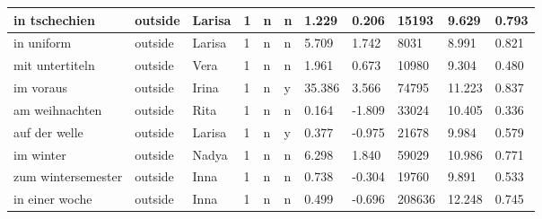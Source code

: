 \begin{longtable}{|p{4cm}|p{1cm}|p{1.2cm}|p{0.5cm}|p{0.5cm}|p{0.5cm}|R{1cm}|R{1cm}|R{1cm}|R{1cm}|R{1cm}|}
in tschechien              & outside           & Larisa        & 1                                   & n                          & n                          & 1.229      & 0.206         & 15193                   & 9.629                         & 0.793                   \\ \hline
in uniform                 & outside           & Larisa        & 1                                   & n                          & n                          & 5.709      & 1.742         & 8031                    & 8.991                         & 0.821                   \\ \hline
mit untertiteln            & outside           & Vera          & 1                                   & n                          & n                          & 1.961      & 0.673         & 10980                   & 9.304                         & 0.480                   \\ \hline
im voraus                  & outside           & Irina         & 1                                   & n                          & y                          & 35.386     & 3.566         & 74795                   & 11.223                        & 0.837                   \\ \hline
am weihnachten             & outside           & Rita          & 1                                   & n                          & n                          & 0.164      & -1.809        & 33024                   & 10.405                        & 0.336                   \\ \hline
auf der welle              & outside           & Larisa        & 1                                   & n                          & y                          & 0.377      & -0.975        & 21678                   & 9.984                         & 0.579                   \\ \hline
im winter                  & outside           & Nadya         & 1                                   & n                          & n                          & 6.298      & 1.840         & 59029                   & 10.986                        & 0.771                   \\ \hline
zum wintersemester         & outside           & Inna          & 1                                   & n                          & n                          & 0.738      & -0.304        & 19760                   & 9.891                         & 0.533                   \\ \hline
in einer woche             & outside           & Inna          & 1                                   & n                          & n                          & 0.499      & -0.696        & 208636                  & 12.248                        & 0.745                   \\ \hline

\end{longtable}
